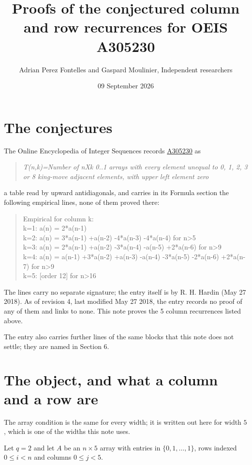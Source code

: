 \documentclass[11pt]{article}
\title{Proofs of the conjectured column and row recurrences for OEIS A305230}
\author{Adrian Perez Fontelles and Gaspard Moulinier, Independent researchers}
\date{09 September 2026}
\theoremstyle{definition}
\begin{document}
\maketitle
\section{The conjectures}

The Online Encyclopedia of Integer Sequences records \href{https://oeis.org/A305230}{A305230} as

\begin{quote}\itshape T(n,k)=Number of nXk 0..1 arrays with every element unequal to 0, 1, 2, 3 or 8 king-move adjacent elements, with upper left element zero\end{quote}

a table read by upward antidiagonals, and carries in its Formula section the following empirical lines, none of them proved there:

\begin{quote}\ttfamily Empirical for column k:\\
k=1: a(n) = 2*a(n-1)\\k=2: a(n) = 3*a(n-1) +a(n-2) -4*a(n-3) -4*a(n-4) for n>5\\k=3: a(n) = 2*a(n-1) +a(n-2) -3*a(n-4) -a(n-5) +2*a(n-6) for n>9\\k=4: a(n) = a(n-1) +3*a(n-2) +a(n-3) -a(n-4) -3*a(n-5) -2*a(n-6) +2*a(n-7) for n>9\\k=5: [order 12] for n>16\end{quote}

The lines carry no separate signature; the entry itself is by R. H. Hardin (May 27 2018). As of revision 4, last modified May 27 2018, the entry records no proof of any of them and links to none. This note proves the 5 column recurrences listed above.

The entry also carries further lines of the same blocks that this note does not settle; they are named in Section 6.

\section{The object, and what a column and a row are}

The array condition is the same for every width; it is written out here for width $5$, which is one of the widths this note uses.

Let $q = 2$ and let $A$ be an $n \times 5$ array with entries in $\{0,1,\dots,1\}$, rows indexed $0 \le i < n$ and columns $0 \le j < 5$.
\end{document}

